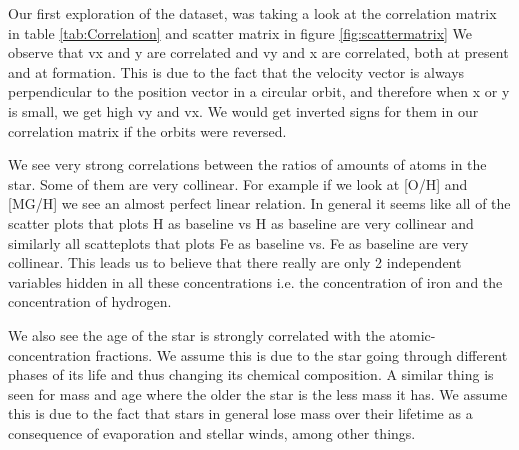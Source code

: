 
Our first exploration of the dataset, was taking a look at the correlation matrix in table \ref{tab:Correlation} and scatter matrix in figure \ref{fig:scattermatrix} We observe that vx and y are correlated and vy and x are correlated, both at present and at formation. This is due to the fact that the velocity vector is always perpendicular to the position vector in a circular orbit, and therefore when x or y is small, we get high vy and vx. We would get inverted signs for them in our correlation matrix if the orbits were reversed.

We see very strong correlations between the ratios of amounts of atoms in the star. Some of them are very collinear. For example if we look at [O/H] and [MG/H] we see an almost perfect linear relation. In general it seems like all of the scatter plots that plots H as baseline vs H as baseline are very collinear and similarly all scatteplots that plots Fe as baseline vs. Fe as baseline are very collinear. This leads us to believe that there really are only 2 independent variables hidden in all these concentrations i.e. the concentration of iron and the concentration of hydrogen.

We also see the age of the star is strongly correlated with the atomic-concentration fractions. We assume this is due to the star going through different phases of its life and thus changing its chemical composition. 
A similar thing is seen for mass and age where the older the star is the less mass it has. We assume this is due to the fact that stars in general lose mass over their lifetime as a consequence of evaporation and stellar winds, among other things. 
